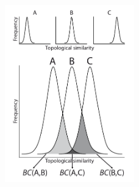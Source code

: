\documentclass[12pt,letterpaper]{article}
\begin{document}
\newpage
\begin{figure}[!htbp]
\centering
    \includegraphics[width=0.5\textwidth]{Figures/In_main/Bhattacharyya_Coefficients1.pdf}
\caption{ }
\end{figure}
\end{document}
